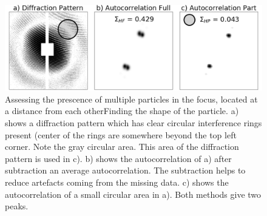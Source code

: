 \begin{figure}[!h]
\centering
\includegraphics[width=120mm]{Chapter_08_ImageClassification_Multiple_Finding.png}
\caption{Assessing the prescence of multiple particles in the focus, located at a distance from each otherFinding the shape of the particle. a) shows a diffraction pattern which has clear circular interference rings present (center of the rings are somewhere beyond the top left corner. Note the gray circular area. This area of the diffraction pattern is used in c). b) shows the autocorrelation of a) after subtraction an average autocorrelation. The subtraction helps to reduce artefacts coming from the missing data. c) shows the autocorrelation of a small circular area in a). Both methods give two peaks.  }\label{fig:multiplefinding}
\end{figure}